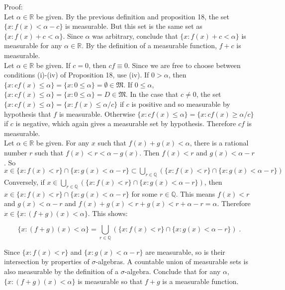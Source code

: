 \documentclass[a4paper]{article}
\begin{document}
Proof:\\

Let $\alpha \in \mathbb{R}$ be given. By the previous definition and proposition 18, the set $\{x : f(x) < \alpha - c\}$ is measurable. But this set is the same set as $\{x: f(x) + c < \alpha\}$. Since $\alpha$ was arbitrary, conclude that $\{x: f(x) + c < \alpha\}$ is measurable for any $\alpha \in \mathbb{R}$. By the definition of a measurable function, $f+c$ is measurable. \\

Let $\alpha \in \mathbb{R}$ be given. If $c=0$, then $cf \equiv 0$. Since we are free to choose between conditions (i)-(iv) of Proposition 18, use (iv). If $0 > \alpha$, then $\{x : cf(x) \leq \alpha\} = \{x : 0\leq \alpha\} = \emptyset \in \mathfrak{M}$. If $0\leq \alpha$, $\{x : cf(x) \leq \alpha\} = \{x : 0 \leq \alpha\} = D \in \mathfrak{M}$. In the case that $c \neq 0$, the set $\{x : cf(x) \leq \alpha\} = \{x : f(x) \leq \alpha/c\}$ if $c$ is positive and so measurable by hypothesis that $f$ is measurable. Otherwise $\{x: cf(x) \leq \alpha\} = \{x : cf(x) \geq \alpha/c\}$  if $c$ is negative, which again gives a measurable set by hypothesis. Therefore $cf$ is measurable. \\

Let $\alpha \in \mathbb{R}$ be given. For any $x$ such that $f(x) + g(x) < \alpha$, there is a rational number $r$ such that $f(x) < r <\alpha - g(x)$. Then $f(x) < r$ and $g(x) < \alpha - r$. So $x \in \{x : f(x) < r\}\cap\{x : g(x) < \alpha - r\} \subset \bigcup_{r\in \mathbb{Q}} \left(\{x : f(x) < r\}\cap\{x : g(x) < \alpha - r\}\right)$ Conversely, if $x \in \bigcup_{r\in \mathbb{Q}} \left(\{x : f(x) < r\}\cap\{x : g(x) < \alpha - r\}\right)$, then  $x \in \{x : f(x) < r\}\cap\{x : g(x) < \alpha - r\}$ for some $r \in \mathbb{Q}$. This means $f(x) < r$ and $g(x) < \alpha - r$ and $f(x) + g(x) < r + g(x) < r + \alpha - r = \alpha$. Therefore $x \in \{x : (f+g)(x) < \alpha\}$. This shows:

$$\{x : (f+g)(x) < \alpha\} = \bigcup_{r \in \mathbb{Q}} \left(\{x : f(x) < r\}\cap\{x : g(x) < \alpha - r\}\right)\;.$$

Since $\{x: f(x) < r\}$ and $\{x: g(x) < \alpha - r\}$ are measurable, so is their intersection by properties of $\sigma$-algebras. A countable union of measurable sets is also measurable by the definition of a $\sigma$-algebra. Conclude that for any $\alpha$, $\{x : (f+g)(x) < \alpha\}$ is measurable so that $f+g$ is a measurable function.\\
\end{document}

